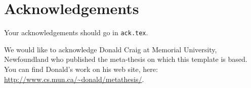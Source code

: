 
\chapter*{Acknowledgements}

Your acknowledgements should go in \verb!ack.tex!. 

We would like to acknowledge Donald Craig at Memorial University,
Newfoundland who published the meta-thesis on which this template is
based. You can find Donald's work on his web site, here:
\url{http://www.cs.mun.ca/~donald/metathesis/}.

